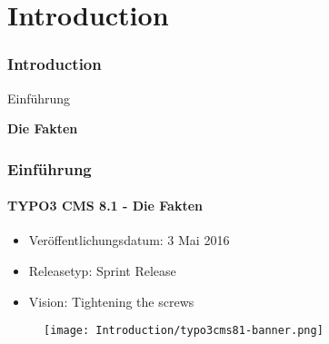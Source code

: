 %

\section{Introduction}
\begin{frame}[fragile]
	\frametitle{Introduction}

	\begin{center}\huge{Einführung}\end{center}
	\begin{center}\huge{\color{typo3darkgrey}\textbf{Die Fakten}}\end{center}

\end{frame}

\begin{frame}[fragile]
	\frametitle{Einführung}
	\framesubtitle{TYPO3 CMS 8.1 - Die Fakten}

	\begin{itemize}
		\item Veröffentlichungsdatum: 3 Mai 2016
		\item Releasetyp: Sprint Release
		\item Vision: Tightening the screws
	\end{itemize}

	\begin{figure}
		\texttt{[image: Introduction/typo3cms81-banner.png]}
	\end{figure}

\end{frame}

